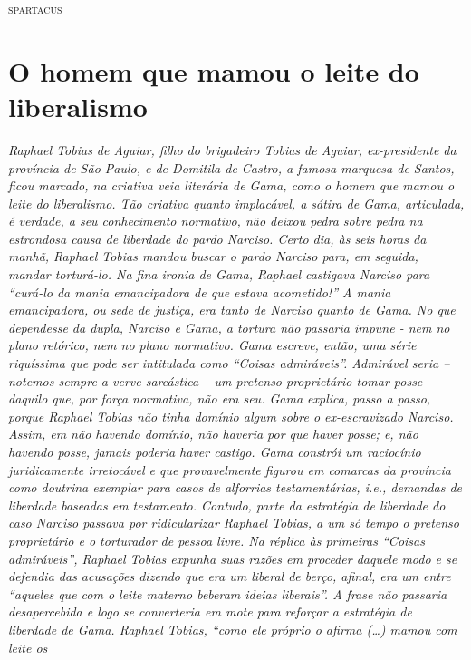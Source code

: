 \begin{flushright}
\textsc{spartacus}
\end{flushright}

\part{O homem que mamou o leite do liberalismo}

\begin{argumento}
\emph{Raphael Tobias de Aguiar, filho do brigadeiro Tobias de Aguiar,
ex-presidente da província de São Paulo, e de Domitila de Castro, a
famosa marquesa de Santos, ficou marcado, na criativa veia literária de
Gama, como o homem que mamou o leite do liberalismo. Tão criativa quanto
implacável, a sátira de Gama, articulada, é verdade, a seu conhecimento
normativo, não deixou pedra sobre pedra na estrondosa causa de liberdade
do pardo Narciso. Certo dia, às seis horas da manhã, Raphael Tobias
mandou buscar o pardo Narciso para, em seguida, mandar torturá-lo. Na
fina ironia de Gama, Raphael castigava Narciso para ``curá-lo da mania
emancipadora de que estava acometido!'' A mania emancipadora, ou sede de
justiça, era tanto de Narciso quanto de Gama. No que dependesse da
dupla, Narciso e Gama, a tortura não passaria impune - nem no plano
retórico, nem no plano normativo. Gama escreve, então, uma série
riquíssima que pode ser intitulada como ``Coisas admiráveis''. Admirável
seria -- notemos sempre a verve sarcástica -- um pretenso proprietário
tomar posse daquilo que, por força normativa, não era seu. Gama explica,
passo a passo, porque Raphael Tobias não tinha domínio algum sobre o
ex-escravizado Narciso. Assim, em não havendo domínio, não haveria por
que haver posse; e, não havendo posse, jamais poderia haver castigo.
Gama constrói um raciocínio juridicamente irretocável e que
provavelmente figurou em comarcas da província como doutrina exemplar
para casos de alforrias testamentárias, i.e., demandas de liberdade
baseadas em testamento. Contudo, parte da estratégia de liberdade do
caso Narciso passava por ridicularizar Raphael Tobias, a um só tempo o
pretenso proprietário e o torturador de pessoa livre. Na réplica às
primeiras ``Coisas admiráveis'', Raphael Tobias expunha suas razões em
proceder daquele modo e se defendia das acusações dizendo que era um
liberal de berço, afinal, era um entre ``aqueles que com o leite materno
beberam ideias liberais''. A frase não passaria desapercebida e logo se
converteria em mote para reforçar a estratégia de liberdade de Gama.
Raphael Tobias, ``como ele próprio o afirma (\ldots{}) mamou com leite os
}
\end{argumento}
